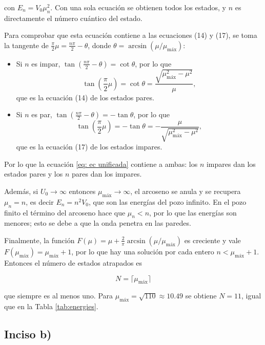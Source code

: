 con $E_n=V_0\mu_n^2$. Con una sola ecuación se obtienen todos los estados, y $n$ es directamente el número cuántico del estado.

Para comprobar que esta ecuación contiene a las ecuaciones (14) y (17), se toma la tangente de $\frac{\pi}{2}\mu = \frac{n\pi}{2} - \theta$, donde $\theta=\arcsin(\mu/\mu_{\text{máx}})$:

\begin{itemize}
    \item Si $n$ es impar, $\tan\left(\frac{n\pi}{2}-\theta\right)=\cot\theta$, por lo que
    \begin{equation*}
        \tan\left(\frac{\pi}{2}\mu\right) = \cot\theta = \frac{\sqrt{\mu_{\text{máx}}^2-\mu^2}}{\mu},
    \end{equation*}
    que es la ecuación (14) de los estados pares.
    \item Si $n$ es par, $\tan\left(\frac{n\pi}{2}-\theta\right)=-\tan\theta$, por lo que
    \begin{equation*}
        \tan\left(\frac{\pi}{2}\mu\right) = -\tan\theta = -\frac{\mu}{\sqrt{\mu_{\text{máx}}^2-\mu^2}},
    \end{equation*}
    que es la ecuación (17) de los estados impares.
\end{itemize}

Por lo que la ecuación \ref{eq: ec unificada} contiene a ambas: los $n$ impares dan los estados pares y los $n$ pares dan los impares.

Además, si $U_0\to\infty$ entonces $\mu_{\text{máx}}\to\infty$, el arcoseno se anula y se recupera $\mu_n=n$, es decir $E_n=n^2V_0$, que son las energías del pozo infinito. En el pozo finito el término del arcoseno hace que $\mu_n<n$, por lo que las energías son menores; esto se debe a que la onda penetra en las paredes.

Finalmente, la función $F(\mu)=\mu+\frac{2}{\pi}\arcsin(\mu/\mu_{\text{máx}})$ es creciente y vale $F(\mu_{\text{máx}})=\mu_{\text{máx}}+1$, por lo que hay una solución por cada entero $n<\mu_{\text{máx}}+1$. Entonces el número de estados atrapados es

\begin{equation}
    N=\lceil\mu_{\text{máx}}\rceil
\end{equation}

que siempre es al menos uno. Para $\mu_{\text{máx}}=\sqrt{110}\approx10.49$ se obtiene $N=11$, igual que en la Tabla \ref{tab:energies}.


\subsection*{Inciso b)}

